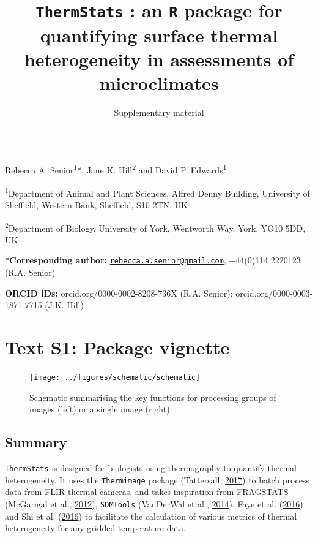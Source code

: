 \documentclass[12pt,british,a4paper,]{article}
\title{\texttt{ThermStats} : an \texttt{R} package for quantifying surface
thermal heterogeneity in assessments of microclimates}
\subtitle{Supplementary material}
\author{}
\date{}
\theoremstyle{definition}
\theoremstyle{definition}
\theoremstyle{definition}
\theoremstyle{remark}
\begin{document}
\maketitle

\begin{center}\rule{0.5\linewidth}{\linethickness}\end{center}

Rebecca A. Senior\textsuperscript{1}*, Jane K. Hill\textsuperscript{2}
and David P. Edwards\textsuperscript{1}

\textsuperscript{1}Department of Animal and Plant Sciences, Alfred Denny
Building, University of Sheffield, Western Bank, Sheffield, S10 2TN, UK

\textsuperscript{2}Department of Biology, University of York, Wentworth
Way, York, YO10 5DD, UK

*\textbf{Corresponding author:}
\href{mailto:rebecca.a.senior@gmail.com}{\nolinkurl{rebecca.a.senior@gmail.com}},
+44(0)114 2220123 (R.A. Senior)

\textbf{ORCID iDs:} orcid.org/0000-0002-8208-736X (R.A. Senior);
orcid.org/0000-0003-1871-7715 (J.K. Hill)

\pagebreak
\raggedright
\setcounter{tocdepth}{2} \tableofcontents
\pagebreak

\section{Text S1: Package vignette}\label{text-s1-package-vignette}




\begin{figure}[H]

{\centering \texttt{[image: ../figures/schematic/schematic]} 

}

\caption{Schematic summarising the key functions for processing
groups of images (left) or a single image (right).}\label{fig:fig-B-2}
\end{figure}

\subsection{Summary}\label{summary}

\texttt{ThermStats} is designed for biologists using thermography to
quantify thermal heterogeneity. It uses the \texttt{Thermimage} package
(Tattersall, \protect\hyperlink{ref-tattersall_thermimage:_2017}{2017})
to batch process data from FLIR thermal cameras, and takes inspiration
from FRAGSTATS (McGarigal et al.,
\protect\hyperlink{ref-fragstats_2012}{2012}), \texttt{SDMTools}
(VanDerWal et al., \protect\hyperlink{ref-sdmtools_2014}{2014}), Faye et
al. (\protect\hyperlink{ref-faye_toolbox_2016}{2016}) and Shi et al.
(\protect\hyperlink{ref-shi_framework_2016}{2016}) to facilitate the
calculation of various metrics of thermal heterogeneity for any gridded
temperature data.
\end{document}
